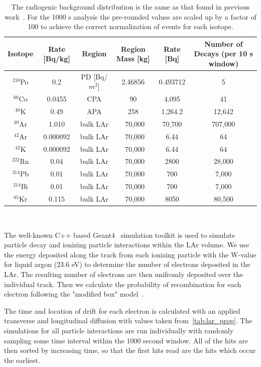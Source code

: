 \begin{table}
\begin{centering}
\begin{tabular}{|c c c c c c|}
 \hline
 Isotope & Rate [Bq/kg] & Region & Region Mass [kg] & Rate [Bq] & Number of Decays (per 10 s window) \\ [0.5ex]
 \hline\hline
  $^{210}$Po & 0.2 & PD [Bq/$m^2$] & 2.46856 & 0.493712 & 5 \\
  $^{60}$Co & 0.0455 & CPA & 90 & 4.095 & 41 \\
  $^{40}$K & 0.49 & APA & 258 & 1,264.2 & 12,642 \\
  $^{39}$Ar & 1.010 & bulk LAr & ~70,000 & 70,700 & 707,000 \\
  $^{42}$Ar & 0.000092 & bulk LAr & ~70,000 & 6.44 & 64 \\
  $^{42}$K  & 0.000092 & bulk LAr & ~70,000 & 6.44 & 64 \\
  $^{222}$Rn & 0.04 & bulk LAr & ~70,000 & 2800 & 28,000 \\
  $^{214}$Pb & 0.01 & bulk LAr & ~70,000 & 700 & 7,000 \\
  $^{214}$Bi & 0.01 & bulk LAr & ~70,000 & 700 & 7,000 \\
  $^{85}$Kr & 0.115 & bulk LAr & ~70,000 & 8050 & 80,500 \\
 \hline
\end{tabular}
\caption{The radiogenic background distribution is the same as that found in previous work~\citep{qpix:shion}.
For the 1000 s analysis the pre-rounded values are scaled up by a factor of 100 to achieve the correct normalization of events for each isotope.}
\end{centering}
\end{table}
~\label{table:radiogenic_backgrounds}

The well-known C++ based Geant4~\citep{geant4:AGOSTINELLI2003250} simulation toolkit is used to simulate particle decay and ionizing particle interactions within the LAr volume.
We use the energy deposited along the track from each ionizing particle with the W-value for liquid argon (23.6 eV) to determine the number of electrons deposited in the LAr.
The resulting number of electrons are then unifromly deposited over the individual track.
Then we calculate the probability of recombination for each electron following the "modified box" model~\citep{2013JInst...8P8005A}.

The time and location of drift for each electron is calculated with an applied transverse and longitudinal diffusion with values taken from~\ref{tab:lar_prop}.
The simulations for all particle interactions are run individually with randomly sampling some time interval within the 1000 second window.
All of the hits are then sorted by increasing time, so that the first hits read are the hits which occur the earliest.

